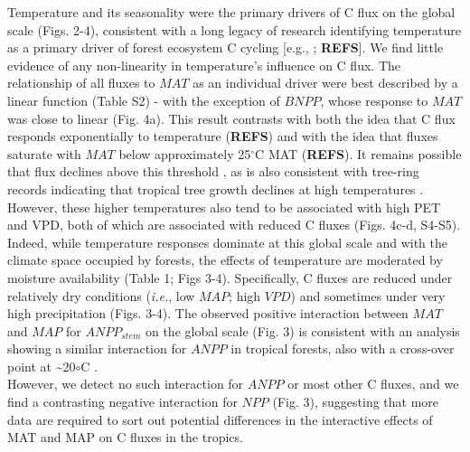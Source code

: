 \documentclass[
]{article}
\begin{document}
{Temperature and its seasonality were the primary drivers of C flux on
the global scale (Figs. 2-4), consistent with a long legacy of research
identifying temperature as a primary driver of forest ecosystem C
cycling {[}e.g., \citet{lieth_primary_1973}; \textbf{REFS}{]}. We find
little evidence of any non-linearity in temperature's influence on C
flux. The relationship of all fluxes to \(MAT\) as an individual driver
were best described by a linear function (Table S2) - with the exception
of \(BNPP\), whose response to \(MAT\) was close to linear (Fig. 4a).
This result contrasts with both the idea that C flux responds
exponentially to temperature (\textbf{REFS}) and with the idea that
fluxes saturate with \(MAT\) below approximately 25\(^\circ\)C MAT
(\textbf{REFS}). It remains possible that flux declines above this
threshold
\citep{larjavaara_temperature_2012, sullivan_sensitivity_2020}, as is
also consistent with tree-ring records indicating that tropical tree
growth declines at high temperatures
\citep[e.g.,][]{vlam_temperature_2014}. However, these higher
temperatures also tend to be associated with high PET and VPD, both of
which are associated with reduced C fluxes (Figs. 4c-d, S4-S5). Indeed,
while temperature responses dominate at this global scale and with the
climate space occupied by forests, the effects of temperature are
moderated by moisture availability (Table 1; Figs 3-4). Specifically, C
fluxes are reduced under relatively dry conditions (\emph{i.e.}, low
\(MAP\); high \(VPD\)) and sometimes under very high precipitation
(Figs. 3-4). The observed positive interaction between \(MAT\) and
\(MAP\) for \(ANPP_{stem}\) on the global scale (Fig. 3) is consistent
with an analysis showing a similar interaction for \(ANPP\) in tropical
forests, also with a cross-over point at \textasciitilde20\(\circ\)C
\citep{taylor_temperature_2017}.\\
However, we detect no such interaction for \(ANPP\) or most other C
fluxes, and we find a contrasting negative interaction for \(NPP\) (Fig.
3), suggesting that more data are required to sort out potential
differences in the interactive effects of MAT and MAP on C fluxes in the
tropics.

}
\end{document}
